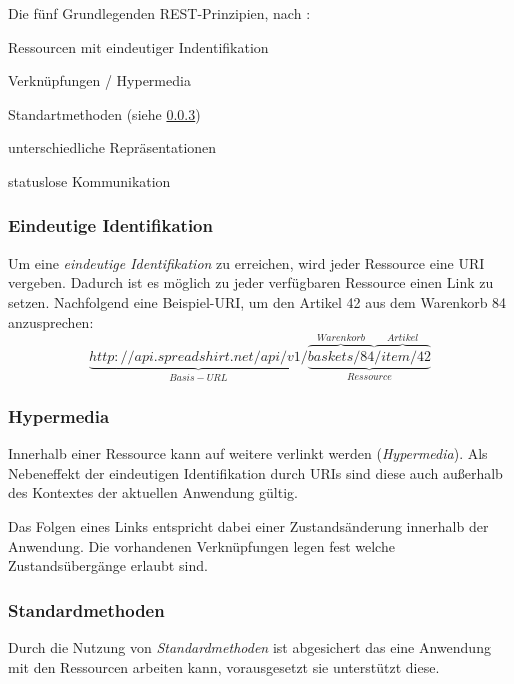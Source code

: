 Die fünf Grundlegenden REST-Prinzipien, nach \cite[11 ff.]{Tilkov09}:
\begin{compactitem}
    \item Ressourcen mit eindeutiger Indentifikation
    \item Verknüpfungen / Hypermedia
    \item Standartmethoden (siehe \cref{sec:standardmethods})
    \item unterschiedliche Repräsentationen
    \item statuslose Kommunikation
\end{compactitem}

\subsubsection{Eindeutige Identifikation}
\label{sec:unambigiousidentification}

Um eine \emph{eindeutige Identifikation} zu erreichen, wird jeder Ressource eine \gls{URI} vergeben. Dadurch ist es möglich zu jeder verfügbaren Ressource einen Link zu setzen. 
Nachfolgend eine Beispiel-URI, um den Artikel 42 aus dem Warenkorb 84 anzusprechen:
\[
    \underbrace{http://api.spreadshirt.net/api/v1/}_{Basis-URL}\underbrace{\overbrace{baskets/84}^{Warenkorb}\overbrace{/item/42}^{Artikel}}_{Ressource}
    \label{RESTexampleURL}
\]

\subsubsection{Hypermedia}
\label{sec:hypermedia}

Innerhalb einer Ressource kann auf weitere verlinkt werden (\emph{Hypermedia}). Als Nebeneffekt der eindeutigen Identifikation durch \glspl{URI} sind diese auch außerhalb des Kontextes der aktuellen Anwendung gültig. 

Das Folgen eines Links entspricht dabei einer Zustandsänderung innerhalb der Anwendung.
Die vorhandenen Verknüpfungen legen fest welche Zustandsübergänge  erlaubt sind.

\subsubsection{Standardmethoden}
\label{sec:standardmethods}

Durch die Nutzung von \emph{Standardmethoden} ist abgesichert das eine Anwendung mit den Ressourcen arbeiten kann, vorausgesetzt sie unterstützt diese. 

